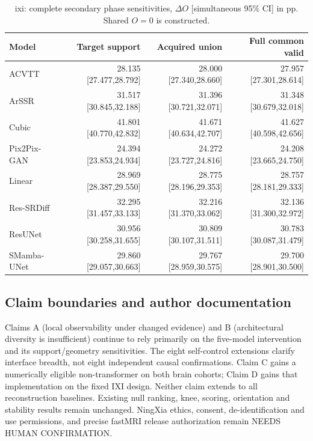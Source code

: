 \begin{table}[t]\centering\scriptsize

\caption{ixi: complete secondary phase sensitivities, $\Delta O$ [simultaneous 95\% CI] in pp. Shared $O=0$ is constructed.}

\begin{tabular}{lrrr}\toprule Model & Target support & Acquired union & Full common valid\\\midrule

ACVTT & 28.135 [27.477,28.792] & 28.000 [27.340,28.660] & 27.957 [27.301,28.614]\\

ArSSR & 31.517 [30.845,32.188] & 31.396 [30.721,32.071] & 31.348 [30.679,32.018]\\

Cubic & 41.801 [40.770,42.832] & 41.671 [40.634,42.707] & 41.627 [40.598,42.656]\\

Pix2Pix-GAN & 24.394 [23.853,24.934] & 24.272 [23.727,24.816] & 24.208 [23.665,24.750]\\

Linear & 28.969 [28.387,29.550] & 28.775 [28.196,29.353] & 28.757 [28.181,29.333]\\

Res-SRDiff & 32.295 [31.457,33.133] & 32.216 [31.370,33.062] & 32.136 [31.300,32.972]\\

ResUNet & 30.956 [30.258,31.655] & 30.809 [30.107,31.511] & 30.783 [30.087,31.479]\\

SMamba-UNet & 29.860 [29.057,30.663] & 29.767 [28.959,30.575] & 29.700 [28.901,30.500]\\

\bottomrule\end{tabular}\end{table}

\subsection{Claim boundaries and author documentation}

Claims A (local observability under changed evidence) and B (architectural diversity is insufficient) continue to rely primarily on the five-model intervention and its support/geometry sensitivities. The eight self-control extensions clarify interface breadth, not eight independent causal confirmations. Claim C gains a numerically eligible non-transformer on both brain cohorts; Claim D gains that implementation on the fixed IXI design. Neither claim extends to all reconstruction baselines. Existing null ranking, knee, scoring, orientation and stability results remain unchanged. NingXia ethics, consent, de-identification and use permissions, and precise fastMRI release authorization remain NEEDS HUMAN CONFIRMATION.

